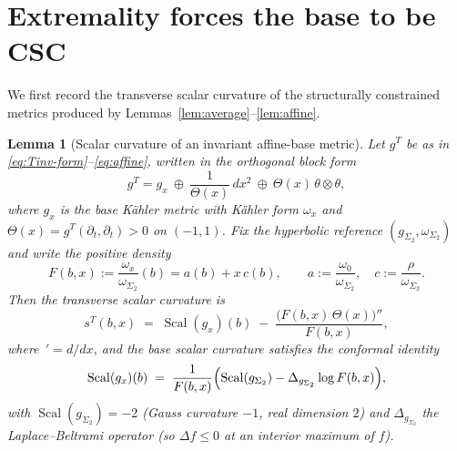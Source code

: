 \documentclass{amsart}
\newtheorem{lemma}{Lemma}
\theoremstyle{definition}
\DeclareMathOperator{\Scal}{Scal}
\begin{document}
\section{Extremality forces the base to be CSC}

We first record the transverse scalar curvature of the structurally constrained
metrics produced by Lemmas~\ref{lem:average}--\ref{lem:affine}.

\begin{lemma}[Scalar curvature of an invariant affine-base metric]\label{lem:scal}
Let $g^T$ be as in \eqref{eq:Tinv-form}--\eqref{eq:affine}, written in the
orthogonal block form
\begin{equation}\label{eq:block}
  g^T = g_x \ \oplus\ \frac{1}{\Theta(x)}\,dx^2 \ \oplus\ \Theta(x)\,\theta\otimes\theta ,
\end{equation}
where $g_x$ is the base K\"ahler metric with K\"ahler form $\omega_x$ and
$\Theta(x)=g^T(\partial_t,\partial_t)>0$ on $(-1,1)$. Fix the hyperbolic
reference $(g_{\Sigma_2},\omega_{\Sigma_2})$ and write the positive density
\[
  F(b,x):=\frac{\omega_x}{\omega_{\Sigma_2}}(b)=a(b)+x\,c(b),\qquad
  a:=\frac{\omega_0}{\omega_{\Sigma_2}},\quad c:=\frac{\rho}{\omega_{\Sigma_2}} .
\]
Then the transverse scalar curvature is
\begin{equation}\label{eq:scalformula}
  s^T(b,x)\;=\;\Scal(g_x)(b)\;-\;\frac{\bigl(F(b,x)\,\Theta(x)\bigr)''}{F(b,x)},
\end{equation}
where $\,'=d/dx$, and the base scalar curvature satisfies the conformal identity
\begin{equation}\label{eq:confscal}
  \Scal(g_x)(b)\;=\;\frac{1}{F(b,x)}\Bigl(\Scal(g_{\Sigma_2})-\Delta_{g_{\Sigma_2}}\log F(b,x)\Bigr),
\end{equation}
with $\Scal(g_{\Sigma_2})=-2$ (Gauss curvature $-1$, real dimension $2$) and
$\Delta_{g_{\Sigma_2}}$ the Laplace--Beltrami operator (so $\Delta f\le0$ at an
interior maximum of $f$).
\end{lemma}
\end{document}
